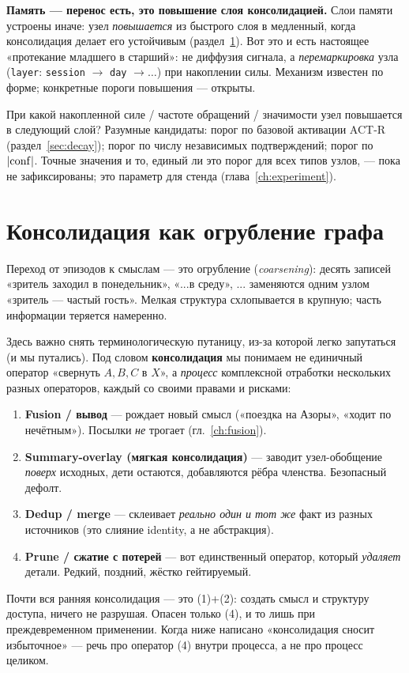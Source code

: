 \smallskip\noindent\textbf{Память --- перенос есть, это повышение слоя консолидацией.}
Слои памяти устроены иначе: узел \emph{повышается} из быстрого слоя в
медленный, когда консолидация делает его устойчивым (раздел~\ref{sec:consolidation}).
Вот это и есть настоящее «протекание младшего в старший»: не диффузия
сигнала, а \emph{перемаркировка} узла
(\texttt{layer}: \texttt{session} $\to$ \texttt{day} $\to \ldots$) при накоплении
силы. Механизм известен по форме; конкретные пороги повышения --- открыты.

\begin{openq}
При какой накопленной силе / частоте обращений / значимости узел повышается в
следующий слой? Разумные кандидаты: порог по базовой активации ACT-R
(раздел~\ref{sec:decay}); порог по числу независимых подтверждений; порог по
$|\mathrm{conf}|$. Точные значения и то, единый ли это порог для всех типов узлов, ---
пока не зафиксированы; это параметр для стенда (глава~\ref{ch:experiment}).
\end{openq}

\section{Консолидация как огрубление графа}
\label{sec:consolidation}

Переход от эпизодов к смыслам --- это огрубление (\textit{coarsening}): десять
записей «зритель заходил в понедельник», «...в среду», ... заменяются одним
узлом «зритель --- частый гость». Мелкая структура схлопывается в крупную;
часть информации теряется намеренно.

\begin{principle}
Здесь важно снять терминологическую путаницу, из-за которой легко запутаться
(и мы путались). Под словом \textbf{консолидация} мы понимаем не единичный
оператор «свернуть $A, B, C$ в $X$», а \emph{процесс} комплексной отработки
нескольких разных операторов, каждый со своими правами и рисками:
\begin{enumerate}
\item \textbf{Fusion / вывод} --- рождает новый смысл («поездка на Азоры»,
«ходит по нечётным»). Посылки \emph{не} трогает (гл.~\ref{ch:fusion}).
\item \textbf{Summary-overlay (мягкая консолидация)} --- заводит узел-обобщение
\emph{поверх} исходных, дети остаются, добавляются рёбра членства.
Безопасный дефолт.
\item \textbf{Dedup / merge} --- склеивает \emph{реально один и тот же} факт из
разных источников (это слияние identity, а не абстракция).
\item \textbf{Prune / сжатие с потерей} --- вот единственный оператор, который
\emph{удаляет} детали. Редкий, поздний, жёстко гейтируемый.
\end{enumerate}
Почти вся ранняя консолидация --- это (1)+(2): создать смысл и структуру
доступа, ничего не разрушая. Опасен только (4), и то лишь при
преждевременном применении. Когда ниже написано «консолидация сносит
избыточное» --- речь про оператор (4) внутри процесса, а не про процесс
целиком.
\end{principle}

